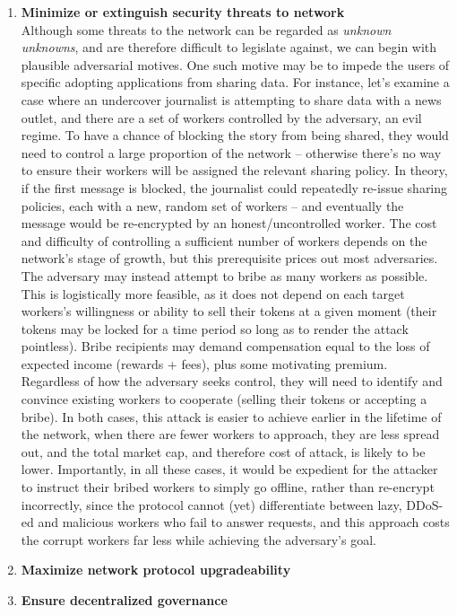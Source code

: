 \documentclass[11pt]{amsart}
\begin{document}
\begin{enumerate}
   \\
   \item \textbf{Minimize or extinguish security threats to network}\label{threats}
   \\
   Although some threats to the network can be regarded as \textit{unknown unknowns}, and are therefore difficult to legislate against, we can begin with plausible adversarial motives. One such motive may be to impede the users of specific adopting applications from sharing data. For instance, let's examine a case where an undercover journalist is attempting to share data with a news outlet, and there are a set of workers controlled by the adversary, an evil regime. To have a chance of blocking the story from being shared, they would need to control a large proportion of the network – otherwise there’s no way to ensure their workers will be assigned the relevant sharing policy. In theory, if the first message is blocked, the journalist could repeatedly re-issue sharing policies, each with a new, random set of workers – and eventually the message would be re-encrypted by an honest/uncontrolled worker. The cost and difficulty of controlling a sufficient number of workers depends on the network’s stage of growth, but this prerequisite prices out most adversaries. The adversary may instead attempt to bribe as many workers as possible. This is logistically more feasible, as it does not depend on each target workers’s willingness or ability to sell their tokens at a given moment (their tokens may be locked for a time period so long as to render the attack pointless). Bribe recipients may demand compensation equal to the loss of expected income (rewards + fees), plus some motivating premium.
   \\
   Regardless of how the adversary seeks control, they will need to identify and convince existing workers to cooperate (selling their tokens or accepting a bribe). In both cases, this attack is easier to achieve earlier in the lifetime of the network, when there are fewer workers to approach, they are less spread out, and the total market cap, and therefore cost of attack, is likely to be lower. Importantly, in all these cases, it would be expedient for the attacker to instruct their bribed workers to simply go offline, rather than re-encrypt incorrectly, since the protocol cannot (yet) differentiate between lazy, DDoS-ed and malicious workers who fail to answer requests, and this approach costs the corrupt workers far less while achieving the adversary's goal.
   \\
   \item \textbf{Maximize network protocol upgradeability}\label{upgrade}
   \\
   \item \textbf{Ensure decentralized governance}\label{gov}
\end{enumerate}
\end{document}
